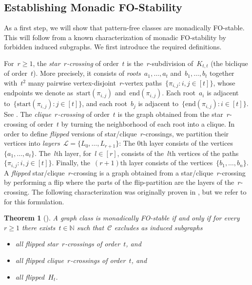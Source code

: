 \documentclass[11pt]{article}      \usepackage[margin=1in]{geometry}  \usepackage{microtype}
\newtheorem{theorem}{Theorem}[section]
\theoremstyle{definition}
\newcommand{\N}[0]{\mathrm{\mathbb{N}}}
\newcommand{\Start}{\mathrm{start}}
\newcommand{\End}{\mathrm{end}}
\newcommand{\LL}{\mathcal{L}}
\newcommand{\CC}{\mathcal{C}}
\renewcommand{\ge}{\geqslant}
\renewcommand{\geq}{\ge}
\begin{document}
\subsection{Establishing Monadic FO-Stability}


As a first step, we will show that pattern-free classes are monadically FO-stable.
This will follow from a known characterization of monadic FO-stability by forbidden induced subgraphs.
We first introduce the required definitions.

For~$r \ge 1$, the \emph{star~$r$-crossing} of order~$t$ is the~$r$-subdivision of~$K_{t,t}$ (the biclique of order~$t$).
More precisely, it consists of \emph{roots}~$a_1,\dots,a_t$ and~$b_1,\dots,b_t$
together with~$t^2$ many pairwise vertex-disjoint~$r$-vertex paths~$\{ \pi_{i,j} : i,j \in [t] \}$, whose endpoints we denote as~$\Start(\pi_{i,j})$ and~$\End(\pi_{i,j})$.
Each root~$a_i$ is adjacent to~$\{ \Start(\pi_{i,j}) : j \in [t] \}$,
and each root~$b_j$ is adjacent to~$\{ \End(\pi_{i,j}) : i \in [t] \}$.
See .
The \emph{clique~$r$-crossing} of order~$t$ is the graph obtained from the star~$r$-crossing of order~$t$
by turning the neighborhood of each root into a clique.
In order to define \emph{flipped} versions of star/clique~$r$-crossings, we partition their vertices into \emph{layers}~$\LL = \{L_0, \ldots, L_{r+1}\}$:
The 0th layer consists of the vertices~$\{a_1,\dots,a_t\}$.
The~$l$th layer, for~$l \in [r]$, consists of the~$l$th vertices of the paths~$\{ \pi_{i,j} : i,j \in [t] \}$.
Finally, the~$(r+1)$th layer consists of the vertices~$\{b_1,\dots,b_n\}$. 
A \emph{flipped} star/clique~$r$-crossing
is a graph obtained from a 
star/clique~$r$-crossing
by performing a flip where the parts of the flip-partition are the layers of the~$r$-crossing.
The following characterization was originally proven in \cite{dreier2024stablemc}, but we refer to \cite{maehlmann-thesis} for this formulation.

\begin{theorem}[{\cite{dreier2024stablemc}}]\label{lem:fo-patterns}
  A graph class is monadically FO-stable if and only if
  for every~$r \geq 1$ there exists~$t \in \N$
        such that~$\CC$ excludes as induced subgraphs
        \begin{itemize}
            \item all flipped star~$r$-crossings of order~$t$, and
            \item all flipped clique~$r$-crossings of order~$t$, and
\item all flipped~$H_t$.
        \end{itemize}
\end{theorem}
\end{document}
